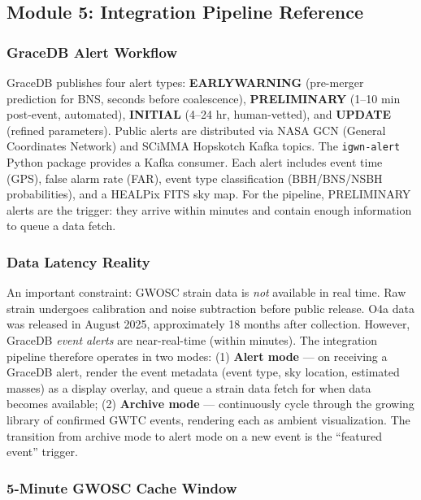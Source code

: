 \documentclass[11pt,letterpaper]{article}
\begin{document}
\subsection{Module 5: Integration Pipeline Reference}

\subsubsection{GraceDB Alert Workflow}

GraceDB publishes four alert types: \textbf{EARLYWARNING} (pre-merger prediction for BNS, seconds before coalescence), \textbf{PRELIMINARY} (1--10 min post-event, automated), \textbf{INITIAL} (4--24 hr, human-vetted), and \textbf{UPDATE} (refined parameters). Public alerts are distributed via NASA GCN (General Coordinates Network) and SCiMMA Hopskotch Kafka topics. The \texttt{igwn-alert} Python package provides a Kafka consumer. Each alert includes event time (GPS), false alarm rate (FAR), event type classification (BBH/BNS/NSBH probabilities), and a HEALPix FITS sky map. For the pipeline, PRELIMINARY alerts are the trigger: they arrive within minutes and contain enough information to queue a data fetch.

\subsubsection{Data Latency Reality}

An important constraint: GWOSC strain data is \emph{not} available in real time. Raw strain undergoes calibration and noise subtraction before public release. O4a data was released in August 2025, approximately 18 months after collection. However, GraceDB \emph{event alerts} are near-real-time (within minutes). The integration pipeline therefore operates in two modes: (1) \textbf{Alert mode} --- on receiving a GraceDB alert, render the event metadata (event type, sky location, estimated masses) as a display overlay, and queue a strain data fetch for when data becomes available; (2) \textbf{Archive mode} --- continuously cycle through the growing library of confirmed GWTC events, rendering each as ambient visualization. The transition from archive mode to alert mode on a new event is the ``featured event'' trigger.

\subsubsection{5-Minute GWOSC Cache Window}
\end{document}
